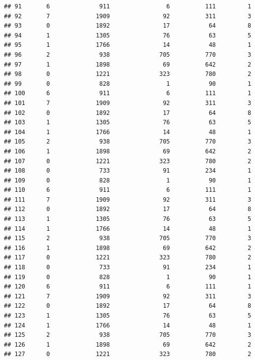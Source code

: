 \documentclass[
]{article}
\begin{document}
\begin{verbatim}
## 91       6              911                6          111         1
## 92       7             1909               92          311         3
## 93       0             1892               17           64         8
## 94       1             1305               76           63         5
## 95       1             1766               14           48         1
## 96       2              938              705          770         3
## 97       1             1898               69          642         2
## 98       0             1221              323          780         2
## 99       0              828                1           90         1
## 100      6              911                6          111         1
## 101      7             1909               92          311         3
## 102      0             1892               17           64         8
## 103      1             1305               76           63         5
## 104      1             1766               14           48         1
## 105      2              938              705          770         3
## 106      1             1898               69          642         2
## 107      0             1221              323          780         2
## 108      0              733               91          234         1
## 109      0              828                1           90         1
## 110      6              911                6          111         1
## 111      7             1909               92          311         3
## 112      0             1892               17           64         8
## 113      1             1305               76           63         5
## 114      1             1766               14           48         1
## 115      2              938              705          770         3
## 116      1             1898               69          642         2
## 117      0             1221              323          780         2
## 118      0              733               91          234         1
## 119      0              828                1           90         1
## 120      6              911                6          111         1
## 121      7             1909               92          311         3
## 122      0             1892               17           64         8
## 123      1             1305               76           63         5
## 124      1             1766               14           48         1
## 125      2              938              705          770         3
## 126      1             1898               69          642         2
## 127      0             1221              323          780         2

\end{verbatim}
\end{document}
